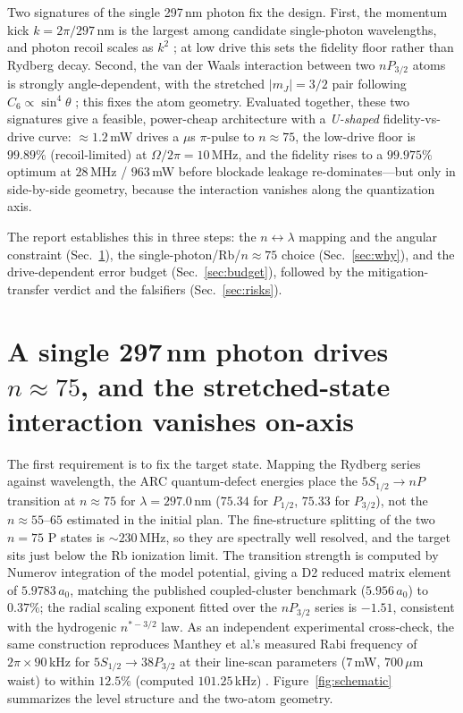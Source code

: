 \documentclass[twocolumn]{article}
\begin{document}
Two signatures of the single 297\,nm photon fix the design. First, the momentum kick $k=2\pi/297\,\mathrm{nm}$ is the largest among candidate single-photon wavelengths, and photon recoil scales as $k^2$ \cite{Robicheaux2021}; at low drive this sets the fidelity floor rather than Rydberg decay. Second, the van der Waals interaction between two $nP_{3/2}$ atoms is strongly angle-dependent, with the stretched $|m_J|=3/2$ pair following $C_6\propto\sin^4\theta$ \cite{Vermersch2014,Walker2008,Weber2016}; this fixes the atom geometry. Evaluated together, these two signatures give a feasible, power-cheap architecture with a \emph{U-shaped} fidelity-vs-drive curve: $\approx1.2$\,mW drives a $\mu$s $\pi$-pulse to $n\approx75$, the low-drive floor is $99.89\%$ (recoil-limited) at $\Omega/2\pi=10$\,MHz, and the fidelity rises to a $99.975\%$ optimum at $28$\,MHz / $963$\,mW before blockade leakage re-dominates---but only in side-by-side geometry, because the interaction vanishes along the quantization axis.

The report establishes this in three steps: the $n\leftrightarrow\lambda$ mapping and the angular constraint (Sec.~\ref{sec:architecture}), the single-photon/Rb/$n\approx75$ choice (Sec.~\ref{sec:why}), and the drive-dependent error budget (Sec.~\ref{sec:budget}), followed by the mitigation-transfer verdict and the falsifiers (Sec.~\ref{sec:risks}).

\section{A single 297\,nm photon drives $n\approx75$, and the stretched-state interaction vanishes on-axis}
\label{sec:architecture}

The first requirement is to fix the target state. Mapping the Rydberg series against wavelength, the ARC quantum-defect energies \cite{Sibalic2016} place the $5S_{1/2}\rightarrow nP$ transition at $n\approx75$ for $\lambda=297.0$\,nm ($75.34$ for $P_{1/2}$, $75.33$ for $P_{3/2}$), not the $n\approx55$--$65$ estimated in the initial plan. The fine-structure splitting of the two $n=75$ P states is $\sim230$\,MHz, so they are spectrally well resolved, and the target sits just below the Rb ionization limit. The transition strength is computed by Numerov integration of the model potential, giving a D2 reduced matrix element of $5.9783\,a_0$, matching the published coupled-cluster benchmark ($5.956\,a_0$) to $0.37\%$; the radial scaling exponent fitted over the $nP_{3/2}$ series is $-1.51$, consistent with the hydrogenic $n^{*-3/2}$ law. As an independent experimental cross-check, the same construction reproduces Manthey et al.'s measured Rabi frequency of $2\pi\times90$\,kHz for $5S_{1/2}\rightarrow38P_{3/2}$ at their line-scan parameters ($7$\,mW, $700\,\mu$m waist) to within $12.5\%$ (computed $101.25$\,kHz) \cite{Manthey2014}. Figure~\ref{fig:schematic} summarizes the level structure and the two-atom geometry.
\end{document}
